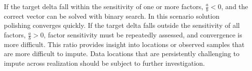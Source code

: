 If the target delta fall within the sensitivity of one or more factors, $\frac{a}{b}<0$, and the correct vector can be solved with binary search. In this scenario solution polishing converges quickly. If the target delta falls outside the sensitivity of all factors, $\frac{a}{b}>0$, factor sensitivity must be repeatedly assessed, and convergence is more difficult. This ratio provides insight into locations or observed samples that are more difficult to impute. Data locations that are persistently challenging to impute across realization should be subject to further investigation.








